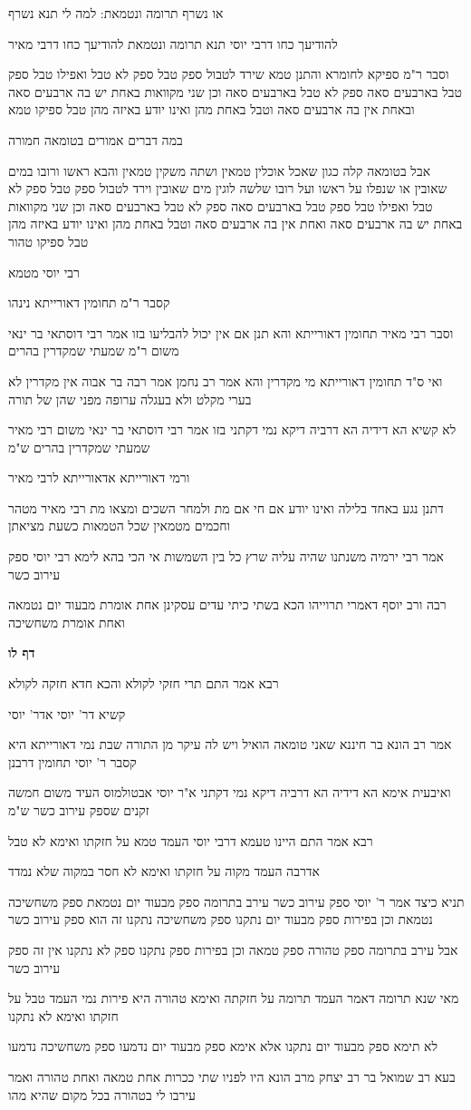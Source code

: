 \documentclass[12pt, openany]{book}
\newcommand{\sethebfont}{
\fontsize{10.5pt}{21.0pt} \selectfont
}
\newcommand{\textblock}[1]{
{\sethebfont #1\\}	
}
\newcommand{\sectname}{}
\newcommand{\newsection}[1]{
	\addcontentsline{toc}{section}{#1}
	\renewcommand{\sectname}{#1}	
	\vspace{-\baselineskip}
	\begin{center}
		\textbf{%
\fontsize{16pt}{16pt}\selectfont
			#1}
	\end{center}
	\vspace{-\baselineskip}
	\nopagebreak
}
\begin{document}
\textblock{או נשרף תרומה ונטמאת: למה לי תנא נשרף}
\textblock{להודיעך כחו דרבי יוסי תנא תרומה ונטמאת להודיעך כחו דרבי מאיר}
\textblock{וסבר ר"מ ספיקא לחומרא והתנן טמא שירד לטבול ספק טבל ספק לא טבל ואפילו טבל ספק טבל בארבעים סאה ספק לא טבל בארבעים סאה וכן שני מקוואות באחת יש בה ארבעים סאה ובאחת אין בה ארבעים סאה וטבל באחת מהן ואינו יודע באיזה מהן טבל ספיקו טמא}
\textblock{במה דברים אמורים בטומאה חמורה}
\textblock{אבל בטומאה קלה כגון שאכל אוכלין טמאין ושתה משקין טמאין והבא ראשו ורובו במים שאובין או שנפלו על ראשו ועל רובו שלשה לוגין מים שאובין וירד לטבול ספק טבל ספק לא טבל ואפילו טבל ספק טבל בארבעים סאה ספק לא טבל בארבעים סאה וכן שני מקוואות באחת יש בה ארבעים סאה ואחת אין בה ארבעים סאה וטבל באחת מהן ואינו יודע באיזה מהן טבל ספיקו טהור}
\textblock{רבי יוסי מטמא}
\textblock{קסבר ר"מ תחומין דאורייתא נינהו}
\textblock{וסבר רבי מאיר תחומין דאורייתא והא תנן אם אין יכול להבליעו בזו אמר רבי דוסתאי בר ינאי משום ר"מ שמעתי שמקדרין בהרים}
\textblock{ואי ס"ד תחומין דאורייתא מי מקדרין והא אמר רב נחמן אמר רבה בר אבוה אין מקדרין לא בערי מקלט ולא בעגלה ערופה מפני שהן של תורה}
\textblock{לא קשיא הא דידיה הא דרביה דיקא נמי דקתני בזו אמר רבי דוסתאי בר ינאי משום רבי מאיר שמעתי שמקדרין בהרים ש"מ}
\textblock{ורמי דאורייתא אדאורייתא לרבי מאיר}
\textblock{דתנן נגע באחד בלילה ואינו יודע אם חי אם מת ולמחר השכים ומצאו מת רבי מאיר מטהר וחכמים מטמאין שכל הטמאות כשעת מציאתן}
\textblock{אמר רבי ירמיה משנתנו שהיה עליה שרץ כל בין השמשות אי הכי בהא לימא רבי יוסי ספק עירוב כשר}
\textblock{רבה ורב יוסף דאמרי תרוייהו הכא בשתי כיתי עדים עסקינן אחת אומרת מבעוד יום נטמאה ואחת אומרת משחשיכה}
\newsection{דף לו}
\textblock{רבא אמר התם תרי חזקי לקולא והכא חדא חזקה לקולא}
\textblock{קשיא דר' יוסי אדר' יוסי}
\textblock{אמר רב הונא בר חיננא שאני טומאה הואיל ויש לה עיקר מן התורה שבת נמי דאורייתא היא קסבר ר' יוסי תחומין דרבנן}
\textblock{ואיבעית אימא הא דידיה הא דרביה דיקא נמי דקתני א"ר יוסי אבטולמוס העיד משום חמשה זקנים שספק עירוב כשר ש"מ}
\textblock{רבא אמר התם היינו טעמא דרבי יוסי העמד טמא על חזקתו ואימא לא טבל}
\textblock{אדרבה העמד מקוה על חזקתו ואימא לא חסר במקוה שלא נמדד}
\textblock{תניא כיצד אמר ר' יוסי ספק עירוב כשר עירב בתרומה ספק מבעוד יום נטמאת ספק משחשיכה נטמאת וכן בפירות ספק מבעוד יום נתקנו ספק משחשיכה נתקנו זה הוא ספק עירוב כשר}
\textblock{אבל עירב בתרומה ספק טהורה ספק טמאה וכן בפירות ספק נתקנו ספק לא נתקנו אין זה ספק עירוב כשר}
\textblock{מאי שנא תרומה דאמר העמד תרומה על חזקתה ואימא טהורה היא פירות נמי העמד טבל על חזקתו ואימא לא נתקנו}
\textblock{לא תימא ספק מבעוד יום נתקנו אלא אימא ספק מבעוד יום נדמעו ספק משחשיכה נדמעו}
\textblock{בעא רב שמואל בר רב יצחק מרב הונא היו לפניו שתי ככרות אחת טמאה ואחת טהורה ואמר עירבו לי בטהורה בכל מקום שהיא מהו}
\end{document}
